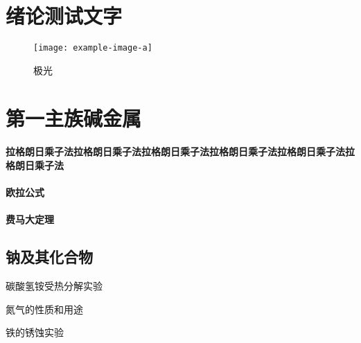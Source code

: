 \documentclass[color=COLORFUL]{textbook-cn}%
\begin{document}
\chapter{绪论\quad 测试文字}


\lipsum
\begin{figure}[htbp]
\centering\texttt{[image: example-image-a]}
\caption{极光}
\end{figure}




\chapter{第一主族\quad 碱金属}


\subsubsection*{拉格朗日乘子法拉格朗日乘子法拉格朗日乘子法拉格朗日乘子法拉格朗日乘子法拉格朗日乘子法}
\lipsum[1-3]

\subsubsection*{欧拉公式}
\lipsum[1-2]

\subsubsection*{费马大定理}
\lipsum[2-3]



\section{钠及其化合物}

\begin{Point}
\lipsum[2]
\end{Point}

\begin{Case}
\item 碳酸氢铵受热分解实验
\item 氮气的性质和用途
\item 铁的锈蚀实验
\end{Case}
\end{document}
